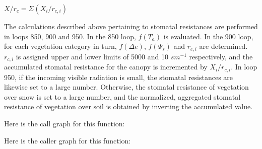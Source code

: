 $X/r_c = \Sigma (X_i / r_{c,i})$

The calculations described above pertaining to stomatal resistances are performed in loops 850, 900 and 950. In the 850 loop, $f(T_a)$ is evaluated. In the 900 loop, for each vegetation category in turn, $f(\Delta e)$, $f(\Psi_s)$ and $r_{c,i}$ are determined. $r_{c,i}$ is assigned upper and lower limits of 5000 and 10 $s m^{-1}$ respectively, and the accumulated stomatal resistance for the canopy is incremented by $X_i / r_{c,i}$. In loop 950, if the incoming visible radiation is small, the stomatal resistances are likewise set to a large number. Otherwise, the stomatal resistance of vegetation over snow is set to a large number, and the normalized, aggregated stomatal resistance of vegetation over soil is obtained by inverting the accumulated value.

Here is the call graph for this function\+:




Here is the caller graph for this function\+:


